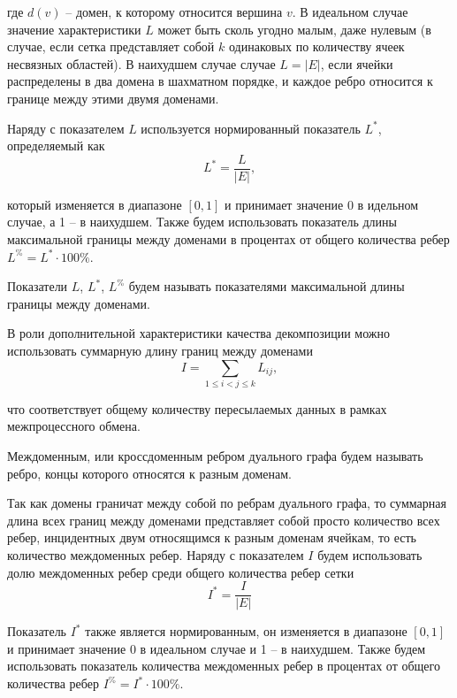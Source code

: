 где $d(v)$ -- домен, к которому относится вершина $v$.
В идеальном случае значение характеристики $L$ может быть сколь угодно малым, даже нулевым (в случае, если сетка представляет собой $k$ одинаковых по количеству ячеек несвязных областей).
В наихудшем случае случае $L = |E|$, если ячейки распределены в два домена в шахматном порядке, и каждое ребро относится к границе между этими двумя доменами.

Наряду с показателем $L$ используется нормированный показатель $L^{*}$, определяемый как
\begin{equation}
	L^{*} = \frac{L}{|E|},
\end{equation}

который изменяется в диапазоне $[0, 1]$ и принимает значение 0 в идельном случае, а 1 -- в наихудшем.
Также будем использовать показатель длины максимальной границы между доменами в процентах от общего количества ребер $L^{\%} = L^{*} \cdot 100\%$.

\begin{definition}
Показатели $L$, $L^{*}$, $L^{\%}$ будем называть показателями максимальной длины границы между доменами\label{term:decomp_maxbord}.
\end{definition}

В роли дополнительной характеристики качества декомпозиции можно использовать суммарную длину границ между доменами
\begin{equation}
	I = \sum_{1 \le i < j \le k}{L_{ij}},
\end{equation}

что соответствует общему количеству пересылаемых данных в рамках межпроцессного обмена.

\begin{definition}
Междоменным, или кроссдоменным ребром\label{term:edge_cross} дуального графа будем называть ребро, концы которого относятся к разным доменам.
\end{definition}

Так как домены граничат между собой по ребрам дуального графа, то суммарная длина всех границ между доменами представляет собой просто количество всех ребер, инцидентных двум относящимся к разным доменам ячейкам, то есть количество междоменных ребер.
Наряду с показателем $I$ будем использовать долю междоменных ребер среди общего количества ребер сетки
\begin{equation}
	I^{*} = \frac{I}{|E|}
\end{equation}

Показатель $I^{*}$ также является нормированным, он изменяется в диапазоне $[0, 1]$ и принимает значение 0 в идеальном случае и 1 -- в наихудшем.
Также будем использовать показатель количества междоменных ребер в процентах от общего количества ребер $I^{\%} = I^{*} \cdot 100\%$.

